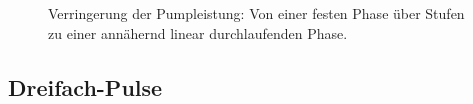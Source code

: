\documentclass[bachelor,       %
               twoside,        %
               BCOR10mm,       %
               english,ngerman, %
               ]{GAUBM}
\begin{document}
\begin{figure}[!htb]
   \hfill
   \caption{Verringerung der Pumpleistung: Von einer festen Phase über Stufen zu einer annähernd linear durchlaufenden Phase.}
   \label{fig:165014steps2}
\end{figure}


\subsection{Dreifach-Pulse}
\end{document}

